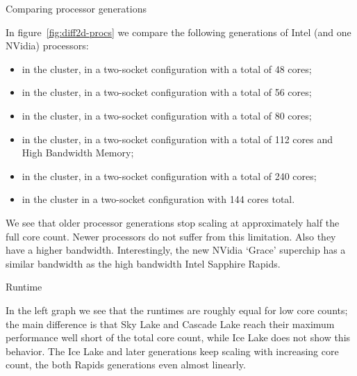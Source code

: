  {Comparing processor generations}

\begin{figure*}[t]
  \hbox\bgroup %
  
  
  \egroup %
  \caption{Comparing different processors (OpenMP). Time (left)
    and bandwidth (right) as function of core count.}
  \label{fig:diff2d-procs}
\end{figure*}

In figure~\ref{fig:diff2d-procs} we compare the following generations of Intel
(and one NVidia) processors:
\begin{itemize}
\item {} in the  cluster,
  in a two-socket configuration with a total of 48 cores;
\item {} in the  cluster,
  in a two-socket configuration with a total of 56 cores;
\item {} in the  cluster,
  in a two-socket configuration with a total of 80 cores;
\item {} in the  cluster,
  in a two-socket configuration with a total of 112 cores and
  High Bandwidth Memory;
\item {} in the  cluster,
  in a two-socket configuration with a total of 240 cores;
\item {} in the  cluster
  in a two-socket configuration with 144 cores total.
\end{itemize}
We see that older processor generations stop scaling at approximately half the full core count.
Newer processors do not suffer from this limitation.
Also they have a higher bandwidth.
Interestingly, the new NVidia `Grace' superchip has a similar bandwidth
as the high bandwidth Intel Sapphire Rapids.

 {Runtime}

In the left graph we see that the runtimes are roughly equal for low core counts;
the main difference is that Sky Lake and Cascade Lake reach their maximum performance
well short of the total core count, while Ice Lake does not show this behavior.
The Ice Lake and later generations keep scaling with increasing core count,
the both Rapids generations even almost linearly.

